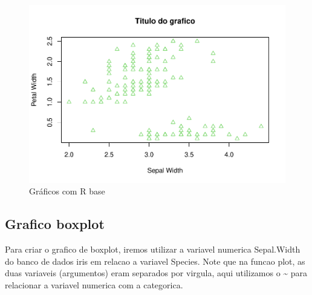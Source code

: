 \documentclass[
]{book}
\newenvironment{Shaded}{\begin{snugshade}}{\end{snugshade}}
\newcommand{\AttributeTok}[1]{\textcolor[rgb]{0.13,0.29,0.53}{#1}}
\newcommand{\CommentTok}[1]{\textcolor[rgb]{0.56,0.35,0.01}{\textit{#1}}}
\newcommand{\DecValTok}[1]{\textcolor[rgb]{0.00,0.00,0.81}{#1}}
\newcommand{\FunctionTok}[1]{\textcolor[rgb]{0.13,0.29,0.53}{\textbf{#1}}}
\newcommand{\NormalTok}[1]{#1}
\newcommand{\SpecialCharTok}[1]{\textcolor[rgb]{0.81,0.36,0.00}{\textbf{#1}}}
\newcommand{\StringTok}[1]{\textcolor[rgb]{0.31,0.60,0.02}{#1}}
\begin{document}
\begin{Shaded}
\end{Shaded}

\begin{figure}
\centering
\includegraphics{_main_files/figure-latex/nome-do-chunk2-6.pdf}
\caption{\label{fig:nome-do-chunk2-6}Gráficos com R base}
\end{figure}

\hypertarget{grafico-boxplot}{%
\subsection{Grafico boxplot}\label{grafico-boxplot}}

Para criar o grafico de boxplot, iremos utilizar a variavel numerica Sepal.Width do banco de dados iris em relacao a variavel Species. Note que na funcao plot, as duas variaveis (argumentos) eram separados por virgula, aqui utilizamos o \textbf{\textasciitilde{}} para relacionar a variavel numerica com a categorica.

\begin{Shaded}
\end{Shaded}
\end{document}
